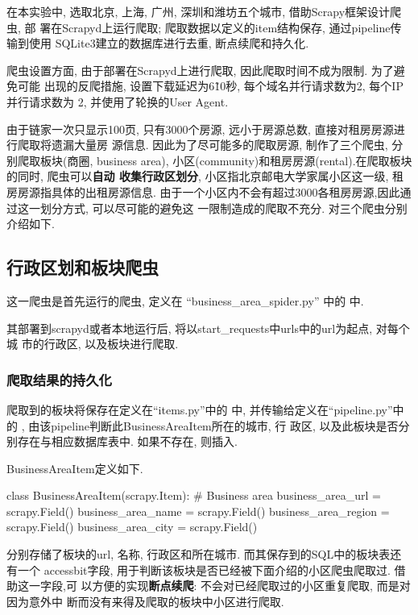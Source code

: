 在本实验中, 选取北京, 上海, 广州, 深圳和潍坊五个城市, 借助Scrapy框架设计爬虫, 部
署在Scrapyd上运行爬取; 爬取数据以定义的item结构保存, 通过pipeline传输到使用
SQLite3建立的数据库进行去重, 断点续爬和持久化.

爬虫设置方面, 由于部署在Scrapyd上进行爬取, 因此爬取时间不成为限制. 为了避免可能
出现的反爬措施, 设置下载延迟为6\~10秒, 每个域名并行请求数为2, 每个IP并行请求数为
2, 并使用了轮换的User Agent.

由于链家一次只显示100页, 只有3000个房源, 远小于房源总数, 直接对租房房源进行爬取将遗漏大量房
源信息. 因此为了尽可能多的爬取房源, 制作了三个爬虫, 分别爬取板块(商圈, business
area), 小区(community)和租房房源(rental).在爬取板块的同时, 爬虫可以\textbf{自动
    收集行政区划分}, 小区指北京邮电大学家属小区这一级, 租房房源指具体的出租房源信息.
由于一个小区内不会有超过3000各租房房源,因此通过这一划分方式, 可以尽可能的避免这
一限制造成的爬取不充分. 对三个爬虫分别介绍如下.

\subsection{行政区划和板块爬虫}
这一爬虫是首先运行的爬虫, 定义在 ``business\_area\_spider.py'' 中的
 中.

其部署到scrapyd或者本地运行后, 将以start\_requests中urls中的url为起点, 对每个城
市的行政区, 以及板块进行爬取.

\subsubsection{爬取结果的持久化}
爬取到的板块将保存在定义在``items.py''中的 
中, 并传输给定义在``pipeline.py''中的  , 由该pipeline判断此BusinessAreaItem所在的城市, 行
政区, 以及此板块是否分别存在与相应数据库表中. 如果不存在, 则插入.

BusinessAreaItem定义如下.
\begin{python}
    class BusinessAreaItem(scrapy.Item):
    # Business area
    business_area_url = scrapy.Field()
    business_area_name = scrapy.Field()
    business_area_region = scrapy.Field()
    business_area_city = scrapy.Field()
\end{python}

分别存储了板块的url, 名称, 行政区和所在城市. 而其保存到的SQL中的板块表还有一个
accessbit字段, 用于判断该板块是否已经被下面介绍的小区爬虫爬取过. 借助这一字段,可
以方便的实现\textbf{断点续爬}: 不会对已经爬取过的小区重复爬取, 而是对因为意外中
断而没有来得及爬取的板块中小区进行爬取.

